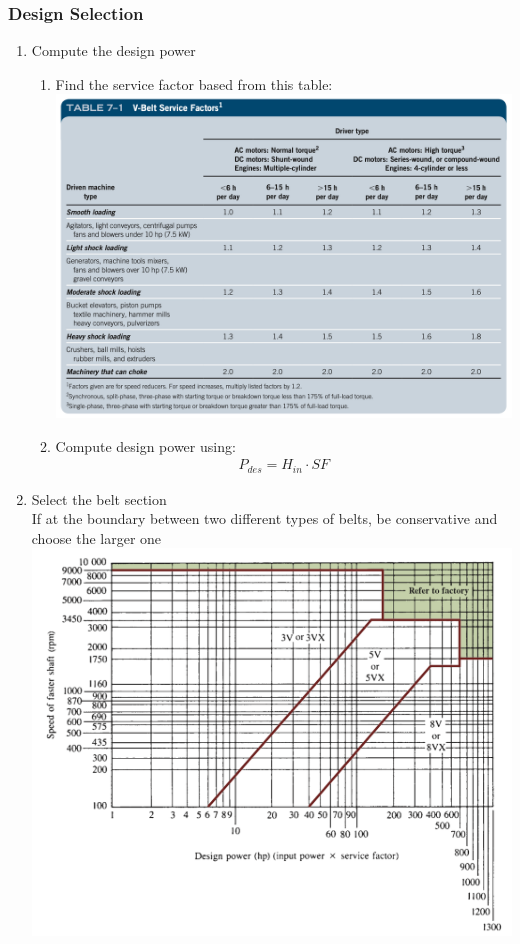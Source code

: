\documentclass[11pt, fleqn]{article}
\begin{document}
\subsubsection{Design Selection}
\begin{enumerate}
    \item Compute the design power
    \begin{enumerate}
        \item Find the service factor based from this table:\\
        \includegraphics[scale=0.55]{Belts/7-1.png}
        \item Compute design power using:
        \begin{align*}
            P_{des}=H_{in}\cdot SF
        \end{align*}
    \end{enumerate}
    \item Select the belt section\\
    If at the boundary between two different types of belts, be
    conservative and choose the larger one\\
    \includegraphics[scale=0.8]{Belts/7-13.png}

\end{enumerate}
\end{document}
